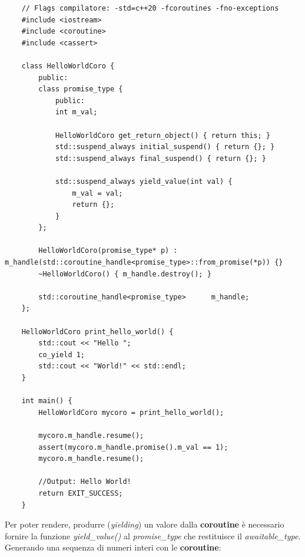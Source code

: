\begin{lstlisting}
	// Flags compilatore: -std=c++20 -fcoroutines -fno-exceptions
	#include <iostream>
	#include <coroutine>
	#include <cassert>
	
	class HelloWorldCoro {
		public:
		class promise_type {
			public:
			int m_val;
			
			HelloWorldCoro get_return_object() { return this; } 
			std::suspend_always initial_suspend() { return {}; } 
			std::suspend_always final_suspend() { return {}; } 
			
			std::suspend_always yield_value(int val) {
				m_val = val; 
				return {};
			}
		};
		
		HelloWorldCoro(promise_type* p) : m_handle(std::coroutine_handle<promise_type>::from_promise(*p)) {}
		~HelloWorldCoro() { m_handle.destroy(); }
		
		std::coroutine_handle<promise_type>      m_handle;
	};
	
	HelloWorldCoro print_hello_world() {
		std::cout << "Hello ";
		co_yield 1;
		std::cout << "World!" << std::endl;
	}
	
	int main() {
		HelloWorldCoro mycoro = print_hello_world();
		
		mycoro.m_handle.resume();
		assert(mycoro.m_handle.promise().m_val == 1);
		mycoro.m_handle.resume();
		
		//Output: Hello World!
		return EXIT_SUCCESS;
	}
\end{lstlisting}

\textsf{\small Per poter rendere, produrre (\emph{yielding}) un valore dalla \textbf{coroutine} è necessario fornire la funzione \emph{yield\_value()} al \emph{promise\_type} che restituisce il \emph{awaitable\_type}. } \\

\textsf{\small Generando una sequenza di numeri interi con le \textbf{coroutine}: } \\

